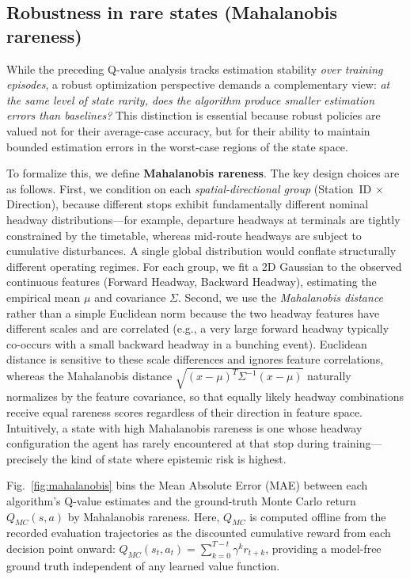 \documentclass[10pt]{article}
\begin{document}
\subsection{Robustness in rare states (Mahalanobis rareness)}
While the preceding Q-value analysis tracks estimation stability \emph{over training episodes}, a robust optimization perspective demands a complementary view: \emph{at the same level of state rarity, does the algorithm produce smaller estimation errors than baselines?} This distinction is essential because robust policies are valued not for their average-case accuracy, but for their ability to maintain bounded estimation errors in the worst-case regions of the state space.

To formalize this, we define \textbf{Mahalanobis rareness}. The key design choices are as follows. First, we condition on each \emph{spatial-directional group} (Station~ID $\times$ Direction), because different stops exhibit fundamentally different nominal headway distributions---for example, departure headways at terminals are tightly constrained by the timetable, whereas mid-route headways are subject to cumulative disturbances. A single global distribution would conflate structurally different operating regimes. For each group, we fit a 2D Gaussian to the observed continuous features (Forward Headway, Backward Headway), estimating the empirical mean $\mu$ and covariance $\Sigma$. Second, we use the \emph{Mahalanobis distance} rather than a simple Euclidean norm because the two headway features have different scales and are correlated (e.g., a very large forward headway typically co-occurs with a small backward headway in a bunching event). Euclidean distance is sensitive to these scale differences and ignores feature correlations, whereas the Mahalanobis distance $\sqrt{(x-\mu)^T\Sigma^{-1}(x-\mu)}$ naturally normalizes by the feature covariance, so that equally likely headway combinations receive equal rareness scores regardless of their direction in feature space. Intuitively, a state with high Mahalanobis rareness is one whose headway configuration the agent has rarely encountered at that stop during training---precisely the kind of state where epistemic risk is highest.

Fig.~\ref{fig:mahalanobis} bins the Mean Absolute Error (MAE) between each algorithm's Q-value estimates and the ground-truth Monte Carlo return $Q_{MC}(s,a)$ by Mahalanobis rareness. Here, $Q_{MC}$ is computed offline from the recorded evaluation trajectories as the discounted cumulative reward from each decision point onward: $Q_{MC}(s_t, a_t) = \sum_{k=0}^{T-t} \gamma^k r_{t+k}$, providing a model-free ground truth independent of any learned value function.
\end{document}
